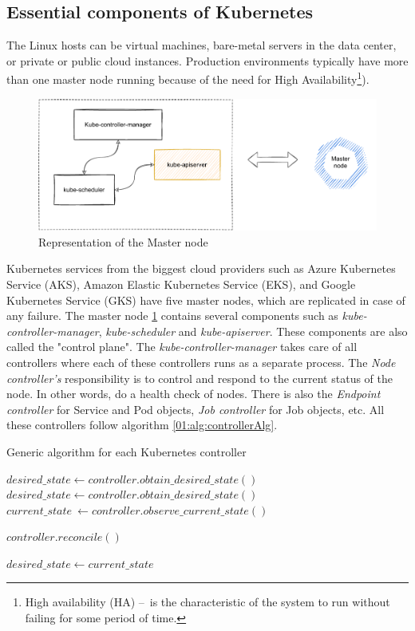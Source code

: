 \subsection{Essential components of Kubernetes}
The Linux hosts can be virtual machines, bare-metal servers in the data center, or private or public cloud instances. Production environments typically have more than one master node running because of the need for High Availability\footnote{High availability (HA) \---\ is the characteristic of the system to run without failing for some period of time.}).
\begin{figure}[!h]
    \centering
    \includegraphics[scale=0.82]{obrazky-figures/02-preliminaries/01-kubernetes/02-architecture-master-sketch}
    \caption{Representation of the Master node}
    \label{02:fig:masterNode}
\end{figure}
Kubernetes services from the biggest cloud providers such as Azure Kubernetes Service (AKS), Amazon Elastic Kubernetes Service (EKS), and Google Kubernetes Service (GKS) have five master nodes, which are replicated in case of any failure.
The master node \ref{02:fig:masterNode} contains several components such as \emph{kube-controller-manager}, \emph{kube-scheduler} and \emph{kube-apiserver}.
These components are also called the "control plane".
The \emph{kube-controller-manager} takes care of all controllers where each of these controllers runs as a separate process.
The \emph{Node controller's} responsibility is to control and respond to the current status of the node.
In other words, do a health check of nodes.
There is also the \emph{Endpoint controller} for Service and Pod objects, \emph{Job controller} for Job objects, etc.
All these controllers follow algorithm \ref{01:alg:controllerAlg}.
\begin{algorithm}[H]
    \caption{Generic algorithm for each Kubernetes controller}
    \label{01:alg:controllerAlg}

    \begin{algorithmic}[1]
        \State $desired\_state \gets controller.obtain\_desired\_state()$
            \State $desired\_state \gets controller.obtain\_desired\_state()$
            \State $current\_state\ \gets controller.observe\_current\_state()$

                \State $controller.reconcile()$
            \EndIf

            \State $desired\_state \gets current\_state$
        \EndWhile
    \end{algorithmic}
\end{algorithm}
